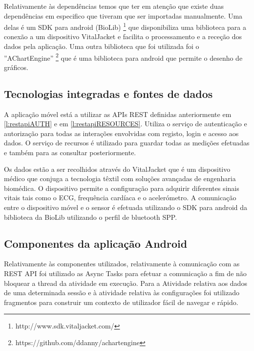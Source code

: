 Relativamente às dependências temos que ter em atenção que existe duas dependências em especifico que tiveram que ser importadas manualmente. Uma delas é um \gls{SDK} para android (BioLib) \footnote{http://www.sdk.vitaljacket.com/} que disponibiliza uma biblioteca para a conexão a um dispositivo VitalJacket e facilita o processamento e a receção dos dados pela aplicação. Uma outra biblioteca que foi utilizada foi o ''AChartEngine'' \footnote{https://github.com/ddanny/achartengine} que é uma biblioteca para android que permite o desenho de gráficos.




\subsection{Tecnologias integradas e fontes de dados}
A aplicação móvel está a utilizar as \gls{API}s \gls{REST} definidas anteriormente em \ref{l:restapiAUTH} e em \ref{l:restapiRESOURCES}. Utiliza o serviço de autenticação e autorização para todas as interações envolvidas com registo, login e acesso aos dados. O serviço de recursos é utilizado para guardar todas as medições efetuadas e também para as consultar posteriormente.\par 
Os dados estão a ser recolhidos através do VitalJacket que é um dispositivo médico que conjuga a tecnologia têxtil com soluções avançadas de engenharia biomédica. O dispositivo permite a configuração para adquirir diferentes sinais vitais tais como o \gls{ECG}, frequência cardíaca e o acelerómetro. A comunicação entre o dispositivo móvel e o sensor é efetuada utilizando o \gls{SDK} para android da biblioteca da BioLib utilizando o perfil de bluetooth \gls{SPP}.




\subsection{Componentes da aplicação Android}

Relativamente às componentes utilizados, relativamente à comunicação com as \gls{REST} \gls{API} foi utilizado as Async Tasks\cite{android-asynctasks} para efetuar a comunicação a fim de não bloquear a thread da atividade em execução. Para a Atividade relativa aos dados de uma determinada sessão e à atividade relativa às configurações foi utilizado fragmentos\cite{android-fragments} para construir um contexto de utilizador fácil de navegar e rápido.



